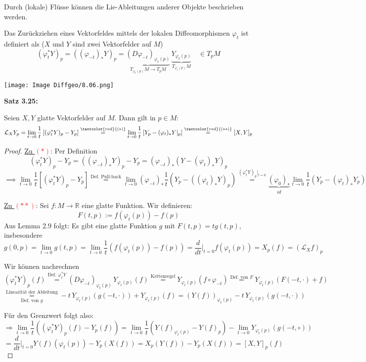 \documentclass[fleqn, 12pt, letterpaper]{article}
\newcommand{\txt}[1]{\text{#1}}
\begin{document}
Durch (lokale) Flüsse können die Lie-Ableitungen anderer Objekte beschrieben werden.

\vspace{1em}

Das Zurückziehen eines Vektorfeldes mittels der lokalen Diffeomorphismen $\varphi_t$ ist definiert als ($X$ und $Y$ sind zwei Vektorfelder auf $M$)
\[
(\varphi_t^\ast Y)_p = ((\varphi_{-t})_* Y)_p = \underbrace{(D \varphi_{-t})_{\varphi_t(p)}}_{
T_{\varphi_t(p)} M \longrightarrow T_p M}\, \underbrace{Y_{\varphi_t(p)}}_{T_{\varphi_t(p)} M }
\quad \in {T_pM}
\]

\texttt{[image: Image Diffgeo/8.06.png]}

\vspace{1em}
\textbf{Satz 3.25:}

Seien $X, Y$ glatte Vektorfelder auf $M$. Dann gilt in $p \in M$:
\[
\mathcal{L}_X Y_p = \lim_{t \to 0} \frac{1}{t} \left[(\varphi_t^\ast Y)_p - Y_p\right] 
\overset{\textcolor{red}{(*)}}{=} \lim_{t \to 0} \frac{1}{t} \left[Y_p - (\varphi_{t})_\ast Y|_p \right] 
\overset{\textcolor{red}{(**)}}{=} [X, Y]_p 
\]
\begin{proof}
\quad

\underline{Zu \textcolor{red}{$(*)$}}:
Per Definition
\[
(\varphi_t^\ast Y)_p - Y_p =  ((\varphi_{-t})_* Y)_p - Y_p = (\varphi_{-t})_*  (Y - (\varphi_t)_* Y)_p
\]
\[
\implies \lim_{t \to 0} \frac{1}{t} \left[(\varphi_t^\ast Y)_p - Y_p\right] \overset{\txt{Def. Pull-back}}{=} \lim_{t \to 0} (\varphi_{-t})_* \frac{1}{t} \left(Y_p - ((\varphi_t)_* Y)_p \right) \overset{(\varphi_t^\ast Y)_p|_{t=0}}{=} \underbrace {(\varphi_0)_*}_{id} \lim_{t \to 0} \frac{1}{t} \left(Y_p - (\varphi_t)_* Y_p \right) 
\]


\underline{Zu \textcolor{red}{$(**)$}}: Sei $f: M \rightarrow \mathbb{R}$ eine glatte Funktion. Wir definieren:
\[
F(t, p) := f(\varphi_t(p))-f(p)
\]
Aus Lemma 2.9 folgt: Es gibt eine glatte Funktion $g$ mit $F(t, p) = tg(t,p) $, insbesondere
\[
g(0, p) = \lim_{t \to 0} g(t, p) = \lim_{t \to 0} \frac{1}{t} \left(f(\varphi_t(p)) - f(p)\right) = \frac{d}{dt} \bigg|_{t=0} f(\varphi_t(p)) = X_p(f) = (\mathcal{L}_X f)_p
\]

Wir können nachrechnen
\[
(\varphi_t^\ast Y)_p(f) \overset{\txt{Def. }\varphi_t^\ast Y}{=} (D \varphi_{-t})_{\varphi_t(p)} \, Y_{\varphi_t(p)}(f)  \overset{\txt{Kettenregel}}{=} Y_{\varphi_t(p)}(f \circ \varphi_{-t})  \overset{\txt{Def. von } F}{=}Y_{\varphi_t(p)}(F( - t, \cdot) + f)
\]
\[
\underset{\txt{Def. von }g}{\overset{\txt{Linearität der Ableitung}}{=}}  -t\,Y_{\varphi_t(p)}(g(-t, \cdot) )+Y_{\varphi_t(p)}(f)   =(Y(f))_{\varphi_t(p)} - t \, Y_{\varphi_t(p)}(g(-t, \cdot))
\]


Für den Grenzwert folgt also:
\[
\Rightarrow \lim_{t \to 0} \frac{1}{t} \left((\varphi_t^* Y)_p(f) - Y_p(f)\right) = \lim_{t \to 0} \frac{1}{t} \left(Y(f)_{\varphi_t(p)} - Y(f)_p \right) - \lim_{t \to 0} Y_{\varphi_t(p)}(g(-t, \circ))
\]
\[= \frac{d}{dt}\big|_{t=0} Y(f)(\varphi_t(p)) - Y_p(X(f)) = X_p(Y(f)) - Y_p(X(f)) = [X, Y]_p(f)
\]
\end{proof}
\end{document}
